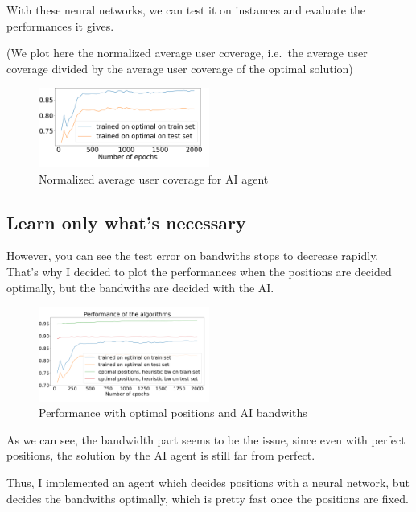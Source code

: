 \documentclass[letterpaper]{article}
\begin{document}
\;

With these neural networks, we can test it on instances and evaluate the performances it gives.

(We plot here the normalized average user coverage, i.e.\, the average user coverage divided by the average user coverage of the optimal solution)


\begin{figure}[H]
    \centering
    \includegraphics[width=0.5\textwidth]{images/bilan_en _fonction epochs.png}
    \caption{Normalized average user coverage for AI agent}
\end{figure}

\subsection{Learn only what's necessary}

However, you can see the test error on bandwiths stops to decrease rapidly.
That's why I decided to plot the performances when the positions are decided optimally, but the bandwiths are decided with the AI.

\begin{figure}[H]
    \centering
    \includegraphics[width=0.5\textwidth]{images/bilan_en _fonction epochs_aibw.png}
    \caption{Performance with optimal positions and AI bandwiths}
\end{figure}

As we can see, the bandwidth part seems to be the issue, since even with perfect positions, the solution by the AI agent
is still far from perfect.

Thus, I implemented an agent which decides positions with a neural network, but decides the bandwiths optimally,
which is pretty fast once the positions are fixed.
\end{document}
